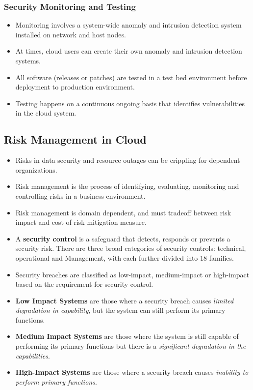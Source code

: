 \documentclass{article}
\begin{document}
\subsubsection{Security Monitoring and Testing}
\begin{itemize}
    \item Monitoring involves a system-wide anomaly and intrusion detection system installed on network and host nodes. 
    
    \item At times, cloud users can create their own anomaly and intrusion detection systems.
    
    \item All software (releases or patches) are tested in a test bed environment before deployment to production environment.
    
    \item Testing happens on a continuous ongoing basis that identifies vulnerabilities in the cloud system. 
\end{itemize}

\subsection{Risk Management in Cloud}
\begin{itemize}
    \item Risks in data security and resource outages can be crippling for dependent organizations.
    
    \item Risk management is the process of identifying, evaluating, monitoring and controlling risks in a business environment.
    
    \item Risk management is domain dependent, and must tradeoff between risk impact and cost of risk mitigation measure.
    
    \item A \textbf{security control} is a safeguard that detects, responds or prevents a security risk. There are three broad categories of security controls: technical, operational and Management, with each further divided into 18 families.
    
    \item Security breaches are classified as low-impact, medium-impact or high-impact based on the requirement for security control. 
    
    \item \textbf{Low Impact Systems} are those where a security breach causes \textit{limited degradation in capability}, but the system can still perform its primary functions.
    
    \item \textbf{Medium Impact Systems} are those where the system is still capable of performing its primary functions but there is a \textit{significant degradation in the capabilities}.
    
    \item \textbf{High-Impact Systems} are those where a security breach causes \textit{inability to perform primary functions}. 
\end{itemize}
\end{document}
